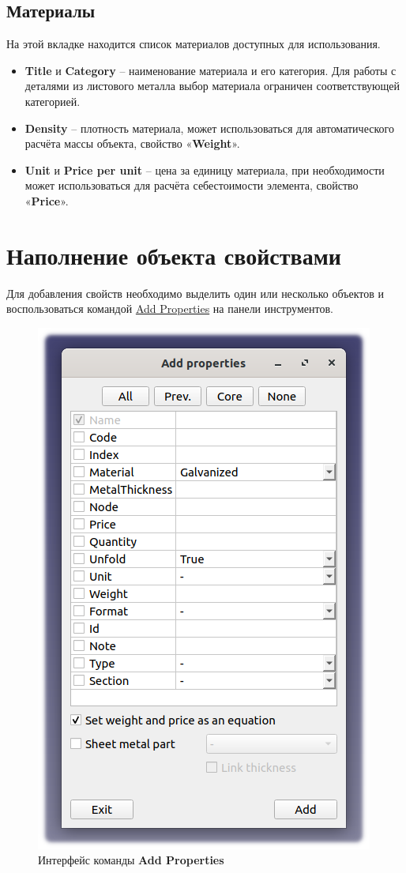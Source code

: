 \documentclass[a4paper,12pt]{article}
\begin{document}
\subsection{Материалы}
На этой вкладке находится список материалов доступных для использования.
\begin{itemize}
    \item \textbf{Title} и \textbf{Category} -- наименование материала и его категория. Для работы с деталями из листового металла выбор материала ограничен соответствующей категорией.
    \item \textbf{Density} -- плотность материала, может использоваться для автоматического расчёта массы объекта, свойство «\textbf{Weight}».
    \item \textbf{Unit} и \textbf{Price per unit} -- цена за единицу материала, при необходимости может использоваться для расчёта себестоимости элемента, свойство «\textbf{Price}».
\end{itemize}

\pagebreak


\section{Наполнение объекта свойствами}

Для добавления свойств необходимо выделить один или несколько объектов и воспользоваться командой \hyperref[sec:5]{Add Properties} на панели инструментов.

\begin{figure}[htp]
	\centering
	\includegraphics[scale=0.7]{img/properties_add.png}
	\caption{Интерфейс команды \textbf{Add Properties}}
	\label{sec:properties_add}
\end{figure}
\end{document}
